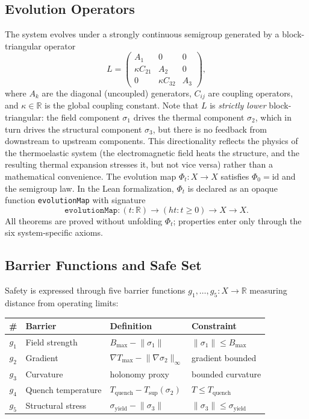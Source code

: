 \documentclass[11pt,a4paper]{article}
\theoremstyle{plain}
\theoremstyle{definition}
\theoremstyle{remark}
\newcommand{\R}{\mathbb{R}}
\newcommand{\norm}[1]{\lVert #1 \rVert}
\newcommand{\kk}{\kappa}
\newcommand{\leaninline}[1]{\texttt{#1}}
\begin{document}
\subsection{Evolution Operators}

The system evolves under a strongly continuous semigroup generated by a
block-triangular operator
\begin{equation}\label{eq:generator}
  L =
  \begin{pmatrix}
    A_1 & 0 & 0 \\
    \kk C_{21} & A_2 & 0 \\
    0 & \kk C_{32} & A_3
  \end{pmatrix},
\end{equation}
where $A_k$ are the diagonal (uncoupled) generators, $C_{ij}$ are
coupling operators, and $\kk \in \R$ is the global coupling constant.
Note that $L$ is \emph{strictly lower} block-triangular: the field
component $\sigma_1$ drives the thermal component $\sigma_2$, which in
turn drives the structural component $\sigma_3$, but there is no
feedback from downstream to upstream components.  This directionality
reflects the physics of the thermoelastic system (the electromagnetic
field heats the structure, and the resulting thermal expansion stresses
it, but not vice versa) rather than a mathematical convenience.
The evolution map $\Phi_t : X \to X$ satisfies $\Phi_0 = \mathrm{id}$
and the semigroup law.  In the Lean formalization, $\Phi_t$ is declared
as an opaque function \leaninline{evolutionMap} with signature
\[
  \leaninline{evolutionMap} : (t : \R) \to (ht : t \ge 0) \to X \to X.
\]
All theorems are proved without unfolding $\Phi_t$; properties enter
only through the six system-specific axioms.

\subsection{Barrier Functions and Safe Set}

Safety is expressed through five barrier functions
$g_1, \ldots, g_5 : X \to \R$ measuring distance from operating limits:

\begin{center}
\begin{tabular}{clll}
  \toprule
  \# & Barrier & Definition & Constraint \\
  \midrule
  $g_1$ & Field strength & $B_{\max} - \norm{\sigma_1}$ & $\norm{\sigma_1} \le B_{\max}$ \\
  $g_2$ & Gradient & $\nabla T_{\max} - \norm{\nabla \sigma_2}_\infty$ & gradient bounded \\
  $g_3$ & Curvature & holonomy proxy & bounded curvature \\
  $g_4$ & Quench temperature & $T_{\mathrm{quench}} - T_{\sup}(\sigma_2)$ & $T \le T_{\mathrm{quench}}$ \\
  $g_5$ & Structural stress & $\sigma_{\mathrm{yield}} - \norm{\sigma_3}$ & $\norm{\sigma_3} \le \sigma_{\mathrm{yield}}$ \\
  \bottomrule
\end{tabular}
\end{center}
\end{document}
